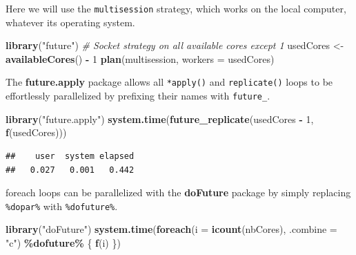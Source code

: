 \documentclass[
  12pt,
  american,
  a4paper,
  extrafontsizes,onecolumn,openright
  ]{memoir}
\newenvironment{Shaded}{\begin{snugshade}}{\end{snugshade}}
\newcommand{\AttributeTok}[1]{\textcolor[rgb]{0.13,0.29,0.53}{#1}}
\newcommand{\CommentTok}[1]{\textcolor[rgb]{0.56,0.35,0.01}{\textit{#1}}}
\newcommand{\DecValTok}[1]{\textcolor[rgb]{0.00,0.00,0.81}{#1}}
\newcommand{\FunctionTok}[1]{\textcolor[rgb]{0.13,0.29,0.53}{\textbf{#1}}}
\newcommand{\NormalTok}[1]{#1}
\newcommand{\OtherTok}[1]{\textcolor[rgb]{0.56,0.35,0.01}{#1}}
\newcommand{\SpecialCharTok}[1]{\textcolor[rgb]{0.81,0.36,0.00}{\textbf{#1}}}
\newcommand{\StringTok}[1]{\textcolor[rgb]{0.31,0.60,0.02}{#1}}
\begin{document}
Here we will use the \texttt{multisession} strategy, which works on the local computer, whatever its operating system.

\scriptsize

\begin{Shaded}
\begin{Highlighting}[]
\FunctionTok{library}\NormalTok{(}\StringTok{"future"}\NormalTok{)}
\CommentTok{\# Socket strategy on all available cores except 1}
\NormalTok{usedCores }\OtherTok{\textless{}{-}} \FunctionTok{availableCores}\NormalTok{() }\SpecialCharTok{{-}} \DecValTok{1}
\FunctionTok{plan}\NormalTok{(multisession, }\AttributeTok{workers =}\NormalTok{ usedCores)}
\end{Highlighting}
\end{Shaded}

\normalsize

The \textbf{future.apply} package allows all \texttt{*apply()} and \texttt{replicate()} loops to be effortlessly parallelized by prefixing their names with \texttt{future\_}.

\scriptsize

\begin{Shaded}
\begin{Highlighting}[]
\FunctionTok{library}\NormalTok{(}\StringTok{"future.apply"}\NormalTok{)}
\FunctionTok{system.time}\NormalTok{(}\FunctionTok{future\_replicate}\NormalTok{(usedCores }\SpecialCharTok{{-}} \DecValTok{1}\NormalTok{, }\FunctionTok{f}\NormalTok{(usedCores)))}
\end{Highlighting}
\end{Shaded}

\begin{verbatim}
##    user  system elapsed 
##   0.027   0.001   0.442
\end{verbatim}

\normalsize

foreach loops can be parallelized with the \textbf{doFuture} package by simply replacing \texttt{\%dopar\%} with \texttt{\%dofuture\%}.

\scriptsize

\begin{Shaded}
\begin{Highlighting}[]
\FunctionTok{library}\NormalTok{(}\StringTok{"doFuture"}\NormalTok{)}
\FunctionTok{system.time}\NormalTok{(}\FunctionTok{foreach}\NormalTok{(}\AttributeTok{i =} \FunctionTok{icount}\NormalTok{(nbCores), }\AttributeTok{.combine =} \StringTok{"c"}\NormalTok{) }\SpecialCharTok{\%dofuture\%}
\NormalTok{    \{}
        \FunctionTok{f}\NormalTok{(i)}
\NormalTok{    \})}
\end{Highlighting}
\end{Shaded}
\end{document}
